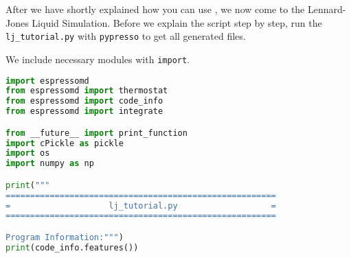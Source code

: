 \documentclass[
paper=a4,                       %
fontsize=11pt,                  %
twoside,                        %
footsepline,                    %
headsepline,                    %
headinclude=false,              %
footinclude=false,              %
pagesize,                       %
]{scrartcl}
\begin{document}
After we have shortly explained how you can use \es{}, we now come to the
Lennard-Jones Liquid Simulation.  Before we explain the script step by step, run the
\texttt{lj\_tutorial.py}  with \texttt{pypresso} to get all generated files.
   

We include necessary modules with \lstinline|import|.
{\small\vspace{0,2cm}
\begin{lstlisting}[language=Python]
import espressomd
from espressomd import thermostat
from espressomd import code_info
from espressomd import integrate

from __future__ import print_function
import cPickle as pickle
import os 
import numpy as np

print("""
=======================================================
=                    lj_tutorial.py                   =
=======================================================

Program Information:""")
print(code_info.features())
\end{lstlisting}}\vspace{0,2cm}
\end{document}
